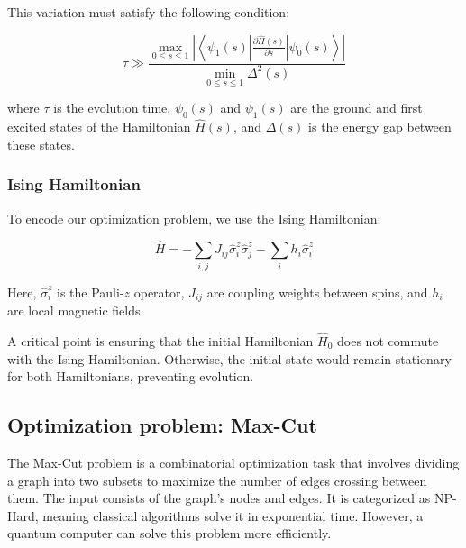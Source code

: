 \documentclass{article}
\begin{document}
\begin{multicols}{2}
This variation must satisfy the following condition:

\begin{equation}
    \tau \gg \frac{\max_{ 0 \leq s \leq 1}  \left| \left\langle \psi_1(s) \left| \frac{\partial \hat{H}(s)}{\partial s} \right| \psi_0(s) \right\rangle \right| }{\min_{0 \leq s \leq 1} \Delta^2(s)}
\end{equation}

where \( \tau \) is the evolution time, \( \psi_0(s) \) and \( \psi_1(s) \) are the ground and first excited states of the Hamiltonian \( \hat{H}(s) \), and \( \Delta(s) \) is the energy gap between these states.

\subsubsection{Ising Hamiltonian}

To encode our optimization problem, we use the Ising Hamiltonian:

\begin{equation}
    \hat{H} = -\sum_{i,j} J_{ij}\hat{\sigma}_i^z\hat{\sigma}_j^z - \sum_i h_i\hat{\sigma}_i^z
\end{equation}

Here, \( \hat{\sigma}_i^z \) is the Pauli-\( z \) operator, \( J_{ij} \) are coupling weights between spins, and \( h_i \) are local magnetic fields.

A critical point is ensuring that the initial Hamiltonian \( \hat{H}_0 \) does not commute with the Ising Hamiltonian. Otherwise, the initial state would remain stationary for both Hamiltonians, preventing evolution.

\subsection{Optimization problem: Max-Cut}

The Max-Cut problem is a combinatorial optimization task that involves dividing a graph into two subsets to maximize the number of edges crossing between them. The input consists of the graph's nodes and edges. It is categorized as NP-Hard, meaning classical algorithms solve it in exponential time. However, a quantum computer can solve this problem more efficiently.


\end{multicols}
\end{document}

